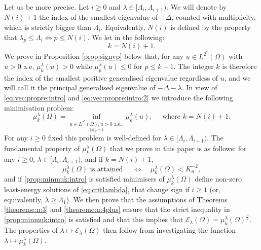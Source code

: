 \documentclass[10pt]{amsart}
\numberwithin{equation}{section}
\newcommand{\Om}{\Omega}
\newcommand{\mkl}{\mu_{k}^{\lambda}}
\newcommand{\mpl}{\mu_{p}^{\lambda}}
\theoremstyle{plain}
\theoremstyle{remark}
\begin{document}
Let us be more precise. Let $i \ge 0$ and $\lambda \in [\Lambda_i, \Lambda_{i+1})$. We will denote by $N(i)+1$ the index of the smallest eigenvalue of $-\Delta$, counted with multiplicity, which is strictly bigger than $\Lambda_i$. Equivalently, $N(i)$ is defined by the property that $\lambda_p \le \Lambda_i \iff p \le N(i)$. We let in the following: 
$$k = N(i)+1.$$
We prove in Proposition \ref{prop:signvp} below that, for any $u \in L^{2^*}(\Om)$ with $u >0$ a.e, $\mkl(u) >0$ while $\mpl(u) \le 0$ for $p \le k-1$. The integer $k$ is therefore the index of the smallest positive generalised eigenvalue regardless of $u$, and we will call it the principal generalised eigenvalue of $-\Delta - \lambda$. In view of \eqref{eq:vec:propre:intro} and \eqref{eq:vec:propre:intro:2} we introduce the following minimisation problem: 
\begin{equation*} 
\mkl(\Om) = \inf_{\underset{\Vert u \Vert_{2^*}=1}{u \in L^{2^*}(\Om), u>0 \text{ a.e.},} } \mkl(u), \quad \text{ where } k = N(i)+1.
\end{equation*}
For any $i \ge 0$ fixed this problem is well-defined for $\lambda \in [\Lambda_i, \Lambda_{i+1})$. The fundamental property of $\mkl(\Om)$ that we prove in this paper is as follows: for any $i \ge0$, $\lambda \in [\Lambda_i, \Lambda_{i+1})$, and if $k = N(i)+1$,
\begin{equation} \label{prop:minmuk:intro}
\mkl(\Om) \text{ is attained } \quad \iff \quad \mkl(\Om) < K_n^{-2},
\end{equation}
and if \eqref{prop:minmuk:intro} is satisfied minimisers of $\mkl(\Om)$ define non-zero least-energy solutions of \eqref{eq:critlambda}, that change sign if $i \ge 1$ (or, equivalently, $\lambda \ge \Lambda_1$). We then prove that the assumptions of Theorems \ref{theoreme:n:3} and \ref{theoreme:n:4plus} ensure that the strict inequality in \eqref{prop:minmuk:intro} is satisfied and that this implies that $\mathcal{E}_\lambda(\Om) = \mkl(\Om)^{\frac{n}{2}}$. The properties of $\lambda \mapsto \mathcal{E}_\lambda(\Om)$ then follow from investigating the function $\lambda \mapsto \mkl(\Om)$. 

\medskip
\end{document}
